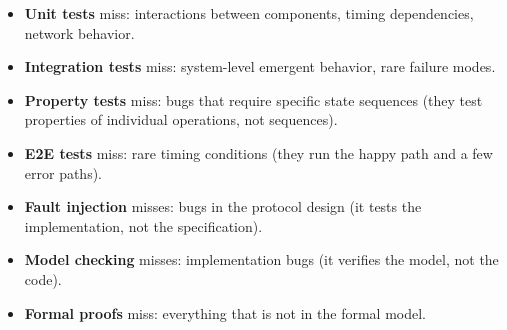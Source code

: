 \begin{itemize}[nosep]
  \item \textbf{Unit tests} miss: interactions between components, timing dependencies,
    network behavior.
  \item \textbf{Integration tests} miss: system-level emergent behavior, rare failure modes.
  \item \textbf{Property tests} miss: bugs that require specific state sequences (they test
    properties of individual operations, not sequences).
  \item \textbf{E2E tests} miss: rare timing conditions (they run the happy path and a few
    error paths).
  \item \textbf{Fault injection} misses: bugs in the protocol design (it tests the
    implementation, not the specification).
  \item \textbf{Model checking} misses: implementation bugs (it verifies the model, not the code).
  \item \textbf{Formal proofs} miss: everything that is not in the formal model.
\end{itemize}

